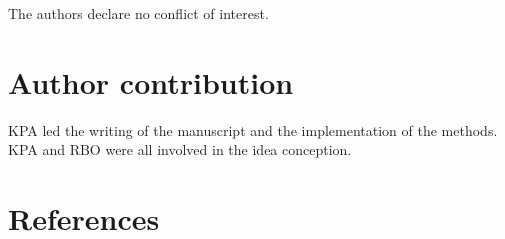 \documentclass[
]{article}
\begin{document}
The authors declare no conflict of interest.

\hypertarget{author-contribution}{%
\section{Author contribution}\label{author-contribution}}

KPA led the writing of the manuscript and the implementation of the
methods. KPA and RBO were all involved in the idea conception.

\hypertarget{references}{%
\section*{References}\label{references}}

\renewcommand{\bibsection}{}

\end{document}

